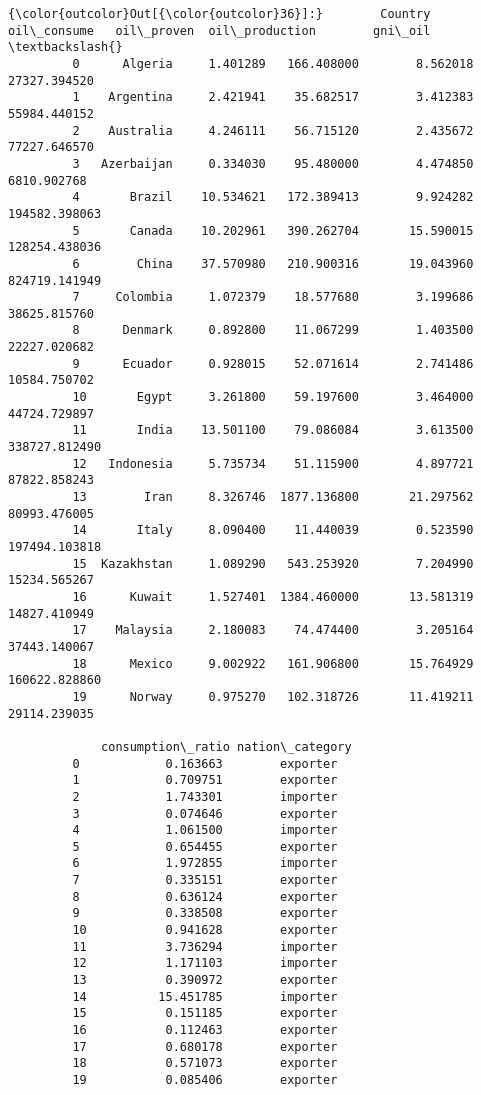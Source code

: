 \documentclass[11pt]{article}
\begin{document}
\begin{Verbatim}[commandchars=\\\{\}]
{\color{outcolor}Out[{\color{outcolor}36}]:}        Country  oil\_consume   oil\_proven  oil\_production        gni\_oil  \textbackslash{}
         0      Algeria     1.401289   166.408000        8.562018   27327.394520   
         1    Argentina     2.421941    35.682517        3.412383   55984.440152   
         2    Australia     4.246111    56.715120        2.435672   77227.646570   
         3   Azerbaijan     0.334030    95.480000        4.474850    6810.902768   
         4       Brazil    10.534621   172.389413        9.924282  194582.398063   
         5       Canada    10.202961   390.262704       15.590015  128254.438036   
         6        China    37.570980   210.900316       19.043960  824719.141949   
         7     Colombia     1.072379    18.577680        3.199686   38625.815760   
         8      Denmark     0.892800    11.067299        1.403500   22227.020682   
         9      Ecuador     0.928015    52.071614        2.741486   10584.750702   
         10       Egypt     3.261800    59.197600        3.464000   44724.729897   
         11       India    13.501100    79.086084        3.613500  338727.812490   
         12   Indonesia     5.735734    51.115900        4.897721   87822.858243   
         13        Iran     8.326746  1877.136800       21.297562   80993.476005   
         14       Italy     8.090400    11.440039        0.523590  197494.103818   
         15  Kazakhstan     1.089290   543.253920        7.204990   15234.565267   
         16      Kuwait     1.527401  1384.460000       13.581319   14827.410949   
         17    Malaysia     2.180083    74.474400        3.205164   37443.140067   
         18      Mexico     9.002922   161.906800       15.764929  160622.828860   
         19      Norway     0.975270   102.318726       11.419211   29114.239035   
         
             consumption\_ratio nation\_category  
         0            0.163663        exporter  
         1            0.709751        exporter  
         2            1.743301        importer  
         3            0.074646        exporter  
         4            1.061500        importer  
         5            0.654455        exporter  
         6            1.972855        importer  
         7            0.335151        exporter  
         8            0.636124        exporter  
         9            0.338508        exporter  
         10           0.941628        exporter  
         11           3.736294        importer  
         12           1.171103        importer  
         13           0.390972        exporter  
         14          15.451785        importer  
         15           0.151185        exporter  
         16           0.112463        exporter  
         17           0.680178        exporter  
         18           0.571073        exporter  
         19           0.085406        exporter  
\end{Verbatim}
            
\end{document}
